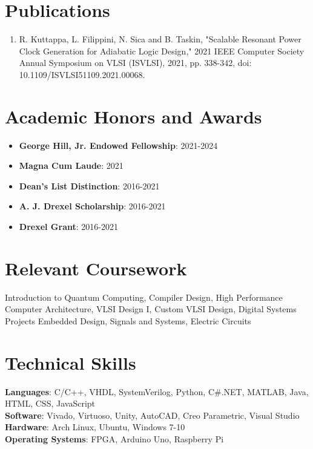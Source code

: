 \documentclass[letterpaper,11pt]{article}
\newcommand{\resumeItem}[1]{
  \item\small{
    {#1 \vspace{-2pt}}
  }
}
\newcommand{\resumeSubItem}[2]{\item\small{
    \textbf{#1}{: #2 \vspace{-5pt}}
  }\vspace{-4pt}}
\newcommand{\resumeSubHeadingListStart}{\begin{itemize}[leftmargin=0.0in, label={}]}
\newcommand{\resumeSubHeadingListEnd}{\end{itemize}}
\begin{document}
\section{Publications}
\begin{enumerate}[leftmargin=15.0pt]
\resumeItem{R. Kuttappa, L. Filippini, N. Sica and B. Taskin,
		"Scalable Resonant Power Clock Generation for Adiabatic Logic Design,"
		2021 IEEE Computer Society Annual Symposium on VLSI (ISVLSI), 2021,
		pp. 338-342, doi: 10.1109/ISVLSI51109.2021.00068.}
\end{enumerate}\vspace{-5pt}
\vspace{-15pt}


\section{Academic Honors and Awards}
\resumeSubHeadingListStart
  \resumeSubItem{George Hill, Jr. Endowed Fellowship}{2021-2024}
  \resumeSubItem{Magna Cum Laude}{2021}
  \resumeSubItem{Dean's List Distinction}{2016-2021}
  \resumeSubItem{A. J. Drexel Scholarship}{2016-2021}
  \resumeSubItem{Drexel Grant}{2016-2021}
\resumeSubHeadingListEnd
\vspace{-8pt}

\section{Relevant Coursework}
Introduction to Quantum Computing, Compiler Design, High Performance Computer Architecture, VLSI Design I,
Custom VLSI Design, Digital Systems Projects Embedded Design, Signals and Systems, Electric Circuits
\vspace{-8pt}

\section{Technical Skills}
 \begin{itemize}[leftmargin=0.0in, label={}]
    \small{\item{
     \textbf{Languages}{: C/C++, VHDL, SystemVerilog, Python, C\#.NET, MATLAB, Java, HTML, CSS, JavaScript} \\
     \textbf{Software}{: Vivado, Virtuoso, Unity, AutoCAD, Creo Parametric, Visual Studio} \\
     \textbf{Hardware}{: Arch Linux, Ubuntu, Windows 7-10} \\
     \textbf{Operating Systems}{: FPGA, Arduino Uno, Raspberry Pi} \\
    }}
 \end{itemize}
\end{document}
